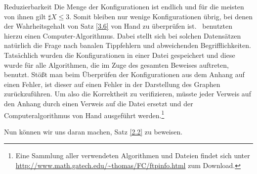 \begin{section}{Reduzierbarkeit}
 Die Menge der Konfigurationen ist endlich und für die meisten von ihnen gilt $\sharp X \leq 3$. Somit bleiben nur wenige Konfigurationen übrig, bei denen der Wahrheitsgehalt von Satz \ref{3.6} von Hand zu überprüfen ist. \rsst \-\ benutzten hierzu einen Computer-Algorithmus. Dabei stellt sich bei solchen Datensätzen natürlich die Frage nach banalen Tippfehlern und abweichenden Begrifflichkeiten. Tatsächlich wurden die Konfigurationen in einer Datei gespeichert und diese wurde für alle Algorithmen, die im Zuge des gesamten Beweises auftreten, benutzt. Stößt man beim Überprüfen der Konfigurationen aus dem Anhang auf einen Fehler, ist dieser auf einen Fehler in der Darstellung des Graphen zurückzuführen. Um also die Korrektheit zu verifizieren, müsste jeder Verweis auf den Anhang durch einen Verweis auf die Datei ersetzt und der Computeralgorithmus von Hand ausgeführt werden.\footnote{Eine Sammlung aller verwendeten Algorithmen und Dateien findet sich unter \url{http://www.math.gatech.edu/~thomas/FC/ftpinfo.html} zum Download.}
 
 Nun können wir uns daran machen, Satz \ref{2.2} zu beweisen.
 

\end{section}

